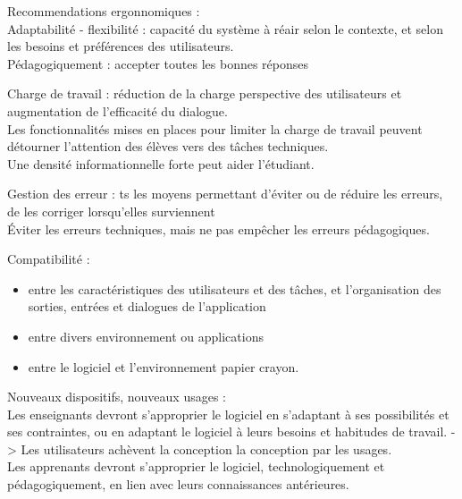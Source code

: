 \documentclass[11pt]{article}
\begin{document}
Recommendations ergonnomiques :\\
Adaptabilité - flexibilité : capacité du système à réair selon le contexte, et selon les besoins et préférences des utilisateurs.\\
Pédagogiquement : accepter toutes les bonnes réponses

Charge de travail : réduction de la charge perspective des utilisateurs et augmentation de l'efficacité du dialogue.\\ Les fonctionnalités mises en places pour limiter la charge de travail peuvent détourner l'attention des élèves vers des tâches techniques.\\Une densité informationnelle forte peut aider l'étudiant.

Gestion des erreur : ts les moyens permettant d'éviter ou de réduire les erreurs, de les corriger lorsqu'elles surviennent\\ Éviter les erreurs techniques, mais ne pas empêcher les erreurs pédagogiques.

Compatibilité :\\
\begin{itemize}
	\item entre les caractéristiques des utilisateurs et des tâches, et l'organisation des sorties, entrées et dialogues de l'application
	\item entre divers environnement ou applications
	\item entre le logiciel et l'environnement papier crayon.
\end{itemize}

\vskip 1cm

Nouveaux dispositifs, nouveaux usages :\\
Les enseignants devront s'approprier le logiciel en s'adaptant à ses possibilités et ses contraintes, ou en adaptant le logiciel à leurs besoins et habitudes de travail. -> Les utilisateurs achèvent la conception la conception par les usages.\\

Les apprenants devront s'approprier le logiciel, technologiquement et pédagogiquement, en lien avec leurs connaissances antérieures.
\end{document}
